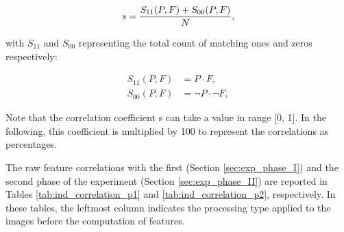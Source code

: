 \begin{equation}
s = {{S_{11}(P, F) + S_{00}(P, F)} \over {N}},
\end{equation}

with $S_{11}$ and $S_{00}$ representing the total count of matching ones and zeros respectively:

\begin{align}
    S_{11}(P, F) &= P \cdot F,\\
    S_{00}(P, F) &= \neg P \cdot \neg F, 
\end{align}


Note that the correlation coefficient s can take a value in range [0, 1]. In the following, this coefficient is multiplied by 100 to represent the correlations as percentages.

The raw feature correlations with the first (Section \ref{sec:exp_phase_I}) and the second phase of the experiment (Section \ref{sec:exp_phase_II}) are reported in Tables \ref{tab:ind_correlation_p1} and \ref{tab:ind_correlation_p2}, respectively. In these tables, the leftmost column indicates the processing type applied to the images before the computation of features.

